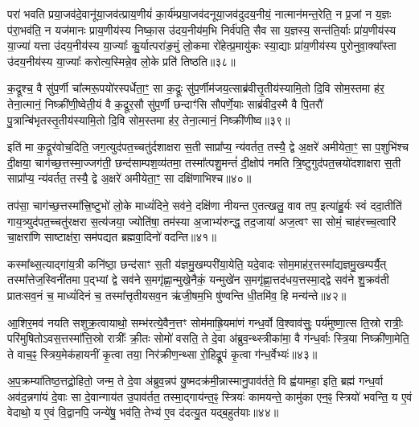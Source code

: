 परा॑ भवति प्रया॒जव॑दे॒वानू॑या॒जव॑त्प्राय॒णीयं॑ का॒र्य॑म्प्रया॒जव॑दनूया॒जव॑दुदय॒नीयं॒ नात्मान॑मन्त॒रेति॒ न प्र॒जां न य॒ज्ञः प॑रा॒भव॑ति॒ न यज॑मानः प्राय॒णीय॑स्य निष्का॒स उ॑दय॒नीय॑म॒भि निर्व॑पति॒ सैव सा य॒ज्ञस्य॒ सन्त॑ति॒र्याः प्रा॑य॒णीय॑स्य या॒ज्या॑ यत्ता उ॑दय॒नीय॑स्य या॒ज्याः᳚ कु॒र्यात्परा॑ङ॒मुं लो॒कमा रो॑हेत्प्र॒मायु॑कः स्या॒द्याः प्रा॑य॒णीय॑स्य पुरोनुवा॒क्या᳚स्ता उ॑दय॒नीय॑स्य या॒ज्याः᳚ करोत्य॒स्मिन्ने॒व लो॒के प्रति॑ तिष्ठति॥३८॥

{\anuvakamend[{प्रज्ञा᳚त्यै पश्यत्यनूया॒जव॒द्यज॑मा॒नो\-ऽनु॑ पुरोनुवा॒क्या᳚स्ता अ॒ष्टौ च॑॥५॥}]}

क॒द्रूश्च॒ वै सु॑प॒र्णी चा᳚त्मरू॒पयो॑रस्पर्धेता॒ꣳ॒ सा क॒द्रूः सु॑प॒र्णीम॑जय॒त्साब्र॑वीत्तृ॒तीय॑स्यामि॒तो दि॒वि सोम॒स्तमा ह॑र॒ तेना॒त्मानं॒ निष्क्री॑णी॒ष्वेती॒यं वै क॒द्रूर॒सौ सु॑प॒र्णी छन्दाꣳ॑सि सौपर्णे॒याः साब्र॑वीद॒स्मै वै पि॒तरौ॑ पु॒त्रान्बि॑भृतस्तृ॒तीय॑स्यामि॒तो दि॒वि सोम॒स्तमा ह॑र॒ तेना॒त्मानं॒ निष्क्री॑णीष्व॥३९॥

इति॑ मा क॒द्रूर॑वोच॒दिति॒ जग॒त्युद॑पत॒च्चतु॑र्दशाक्षरा स॒ती साप्रा᳚प्य॒ न्य॑वर्तत॒ तस्यै॒ द्वे अ॒क्षरे॑ अमीयेता॒ꣳ॒ सा प॒शुभि॑श्च दी॒क्षया॒ चाग॑च्छ॒त्तस्मा॒ज्जग॑ती॒ छन्द॑साम्पश॒व्य॑तमा॒ तस्मा᳚त्पशु॒मन्तं॑ दी॒क्षोप॑ नमति त्रि॒ष्टुगुद॑पत॒त्त्रयो॑दशाक्षरा स॒ती साप्रा᳚प्य॒ न्य॑वर्तत॒ तस्यै॒ द्वे अ॒क्षरे॑ अमीयेता॒ꣳ॒ सा दक्षि॑णाभिश्च॥४०॥

तप॑सा॒ चाग॑च्छ॒त्तस्मा᳚त्त्रि॒ष्टुभो॑ लो॒के माध्यं॑दिने॒ सव॑ने॒ दक्षि॑णा नीयन्त ए॒तत्खलु॒ वाव तप॒ इत्या॑हु॒र्यः स्वं ददा॒तीति॑ गाय॒त्र्युद॑पत॒च्चतु॑रक्षरा स॒त्य॑जया॒ ज्योति॑षा॒ तम॑स्या अ॒जाभ्य॑रुन्द्ध॒ तद॒जाया॑ अज॒त्वꣳ सा सोमं॒ चाह॑रच्च॒त्वारि॑ चा॒क्षरा॑णि साष्टाक्ष॑रा॒ सम॑पद्यत ब्रह्मवा॒दिनो॑ वदन्ति॥४१॥

कस्मा᳚थ्स॒त्याद्गा॑य॒त्री कनि॑ष्ठा॒ छन्द॑साꣳ स॒ती य॑ज्ञमु॒खम्परी॑या॒येति॒ यदे॒वादः सोम॒माह॑र॒त्तस्मा᳚द्यज्ञमु॒खम्पर्यै॒त् तस्मा᳚त्तेज॒स्विनी॑तमा प॒द्भ्यां द्वे सव॑ने स॒मगृ॑ह्णा॒न्मुखे॒नैकं॒ यन्मुखे॑न स॒मगृ॑ह्णा॒त्तद॑धय॒त्तस्मा॒द्द्वे सव॑ने शु॒क्रव॑ती प्रातःसव॒नं च॒ माध्यं॑दिनं च॒ तस्मा᳚त्तृतीयसव॒न ऋ॑जी॒षम॒भि षु॑ण्वन्ति धी॒तमि॑व॒ हि मन्य॑न्ते॥४२॥

आ॒शिर॒मव॑ नयति सशुक्र॒त्वायाथो॒ सम्भ॑रत्ये॒वैन॒त्तꣳ सोम॑माह्रि॒यमा॑णं गन्ध॒र्वो वि॒श्वाव॑सुः॒ पर्य॑मुष्णा॒त्स ति॒स्रो रात्रीः॒ परि॑मुषितो\-ऽवस॒त्तस्मा᳚त्ति॒स्रो रात्रीः᳚ क्री॒तः सोमो॑ वसति॒ ते दे॒वा अ॑ब्रुव॒न्थ्स्त्रीका॑मा॒ वै ग॑न्ध॒र्वाः स्त्रि॒या निष्क्री॑णा॒मेति॒ ते वाच॒ꣴ॒ स्त्रिय॒मेक॑हायनीं कृ॒त्वा तया॒ निर॑क्रीण॒न्थ्सा रो॒हिद्रू॒पं कृ॒त्वा ग॑न्ध॒र्वेभ्यः॑॥४३॥

अ॒प॒क्रम्या॑तिष्ठ॒त्तद्रो॒हितो॒ जन्म॒ ते दे॒वा अ॑ब्रुव॒न्नप॑ यु॒ष्मदक्र॑मी॒न्नास्मानु॒पाव॑र्तते॒ वि ह्व॑यामहा॒ इति॒ ब्रह्म॑ गन्ध॒र्वा अव॑द॒न्नगा॑यं दे॒वाः सा दे॒वान्गाय॑त उ॒पाव॑र्तत॒ तस्मा॒द्गाय॑न्त॒ꣴ॒ स्त्रियः॑ कामयन्ते॒ कामु॑का एन॒ꣴ॒ स्त्रियो॑ भवन्ति॒ य ए॒वं वेदाथो॒ य ए॒वं वि॒द्वानपि॒ जन्ये॑षु॒ भव॑ति॒ तेभ्य॑ ए॒व द॑दत्यु॒त यद्ब॒हुत॑याः॥४४॥

